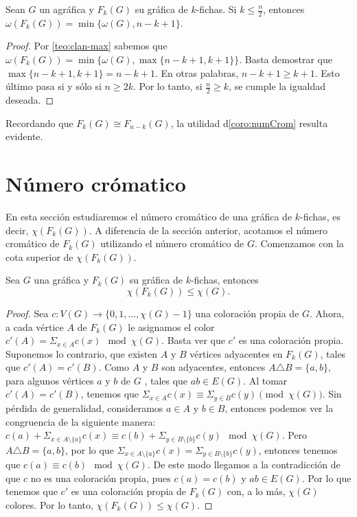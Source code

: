 \begin{corolario}
\label{coro:numCrom}
    Sean $G$ un agr\'afica y $F_k(G)$ su gr\'afica de $k$-fichas. Si $k \leq
    \frac{n}{2}$, entonces $\omega(F_k(G))= \min\{\omega(G), n-k+1\}$.
\end{corolario}

\begin{proof}
    Por \cref{teo:clan-max} sabemos que $\omega(F_k(G))= \min \{\omega(G), \max
    \{n-k+1,k+1\}\}$. Basta demostrar que $\max \{n-k+1, k+1\} = n-k+1$. En
    otras palabras, $n-k+1 \geq k+1$. Esto \'ultimo pasa si y s\'olo si $n \geq
    2k$. Por lo tanto, si $\frac{n}{2} \geq k$, se cumple la igualdad deseada.
\end{proof}

Recordando que $F_k(G) \cong F_{n-k}(G)$, la utilidad  d\cref{coro:numCrom}
resulta evidente.

\section{N\'umero cr\'omatico}%
\label{sec:num cromatico}

En esta secci\'on estudiaremos el n\'umero crom\'atico de una gr\'afica de
$k$-fichas, es decir, $\chi (F_k(G))$. A diferencia de la secci\'on anterior,
acotamos el n\'umero crom\'atico de $F_k(G)$ utilizando el n\'umero crom\'atico
de $G$. Comenzamos con la cota superior de $ \chi (F_k(G))$.

\begin{teorema}
\label{teo:num cromatico de G y F(G)}
    Sea $G$ una gr\'afica y $F_k(G)$ su gr\'afica de $k$-fichas, entonces
    \[
        \chi(F_k(G)) \leq \chi (G).
    \]
\end{teorema}

\begin{proof}
    Sea $c \colon V(G) \to \{0,1, \dots, \chi(G)-1\}$ una coloraci\'on propia de
    $G$. Ahora, a cada v\'ertice $A$ de $F_k(G)$ le asignamos el color $ c'(A)=
    \Sigma_{x \in A}c(x) \mod \chi(G)$. Basta ver que $c'$ es una coloraci\'on
    propia. Suponemos lo contrario, que existen $A$ y $B$ v\'ertices adyacentes
    en $F_k(G)$, tales que $c'(A) = c'(B)$. Como $A$ y $B$ son adyacentes,
    entonces $A \triangle B = \{a,b\}$, para algunos v\'ertices $a$ y $b$ de $G$
    , tales que $ab \in E(G)$. Al tomar $c'(A) = c'(B)$, tenemos que $\Sigma_{x
    \in A}c(x) \equiv \Sigma_{y \in B}c(y) \pmod {\chi(G)}$. Sin p\'erdida de
    generalidad, consideramos $a \in A$ y $b \in B$, entonces podemos ver la
    congruencia de la siguiente manera: $c(a) + \Sigma_{x \in A
    \setminus\{a\}}c(x) \equiv c(b) + \Sigma_{y \in B\setminus\{b\}}c(y) \mod
    \chi(G)$. Pero $A \triangle B = \{a,b\}$, por lo que $\Sigma_{x \in
    A\setminus\{a\}}c(x)=\Sigma_{y \in B\setminus\{b\}}c(y)$, entonces tenemos
    que $c(a) \equiv c(b) \mod \chi(G)$. De este modo llegamos a la
    contradicci\'on de que $c$ no es una coloraci\'on propia, pues $c(a) = c(b)$
    y $ab \in E(G)$. Por lo que tenemos que $c'$ es una coloraci\'on propia de
    $F_k(G)$ con, a lo m\'as, $\chi (G)$ colores. Por lo tanto, $\chi(F_k(G))
    \leq \chi (G)$.
\end{proof}

